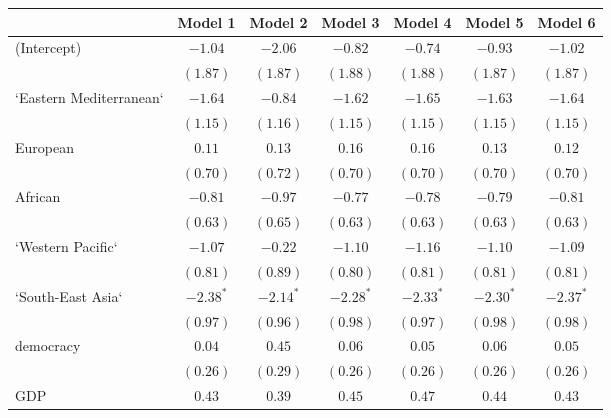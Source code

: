 
\begin{table}[!h]
\begin{center}
\begin{tabular}{l c c c c c c }
\toprule
 & Model 1 & Model 2 & Model 3 & Model 4 & Model 5 & Model 6 \\
\midrule
(Intercept)             & $-1.04$      & $-2.06$      & $-0.82$      & $-0.74$      & $-0.93$      & $-1.02$      \\
                        & $(1.87)$     & $(1.87)$     & $(1.88)$     & $(1.88)$     & $(1.87)$     & $(1.87)$     \\
`Eastern Mediterranean` & $-1.64$      & $-0.84$      & $-1.62$      & $-1.65$      & $-1.63$      & $-1.64$      \\
                        & $(1.15)$     & $(1.16)$     & $(1.15)$     & $(1.15)$     & $(1.15)$     & $(1.15)$     \\
European                & $0.11$       & $0.13$       & $0.16$       & $0.16$       & $0.13$       & $0.12$       \\
                        & $(0.70)$     & $(0.72)$     & $(0.70)$     & $(0.70)$     & $(0.70)$     & $(0.70)$     \\
African                 & $-0.81$      & $-0.97$      & $-0.77$      & $-0.78$      & $-0.79$      & $-0.81$      \\
                        & $(0.63)$     & $(0.65)$     & $(0.63)$     & $(0.63)$     & $(0.63)$     & $(0.63)$     \\
`Western Pacific`       & $-1.07$      & $-0.22$      & $-1.10$      & $-1.16$      & $-1.10$      & $-1.09$      \\
                        & $(0.81)$     & $(0.89)$     & $(0.80)$     & $(0.81)$     & $(0.81)$     & $(0.81)$     \\
`South-East Asia`       & $-2.38^{*}$  & $-2.14^{*}$  & $-2.28^{*}$  & $-2.33^{*}$  & $-2.30^{*}$  & $-2.37^{*}$  \\
                        & $(0.97)$     & $(0.96)$     & $(0.98)$     & $(0.97)$     & $(0.98)$     & $(0.98)$     \\
democracy               & $0.04$       & $0.45$       & $0.06$       & $0.05$       & $0.06$       & $0.05$       \\
                        & $(0.26)$     & $(0.29)$     & $(0.26)$     & $(0.26)$     & $(0.26)$     & $(0.26)$     \\
GDP                     & $0.43$       & $0.39$       & $0.45$       & $0.47$       & $0.44$       & $0.43$       \\

\end{tabular}
\end{center}
\end{table}
